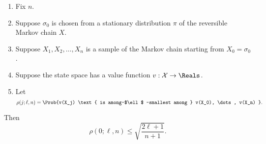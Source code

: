 \documentclass[12pt]{article}
\begin{document}
\begin{proposition}
    \label{thm:significance:basethm}
    \begin{enumerate}
        \item
            Fix \( n \).
        \item
            Suppose \( \sigma_0 \) is chosen from a stationary
            distribution \( \pi \) of the reversible Markov chain \( X \).
        \item
            Suppose \( X_1, X_2, \dots, X_n \) is a sample of the Markov
            chain starting from \( X_0 = \sigma_0 \).
        \item
            Suppose the state space has a value function \( v :
            \mathcal {X} \to \Reals \).
        \item
            Let
            \[
                \rho(j; \ell, n) = \Prob{v(X_j) \text{ is among-$\ell$
                -smallest among } v(X_0), \dots, v(X_n) }.
            \]
    \end{enumerate}

    Then
    \[
        \rho(0; \ell, n) \le \sqrt{ \frac{2\ell + 1}{n+1}}.
    \]



\end{proposition}
\end{document}
